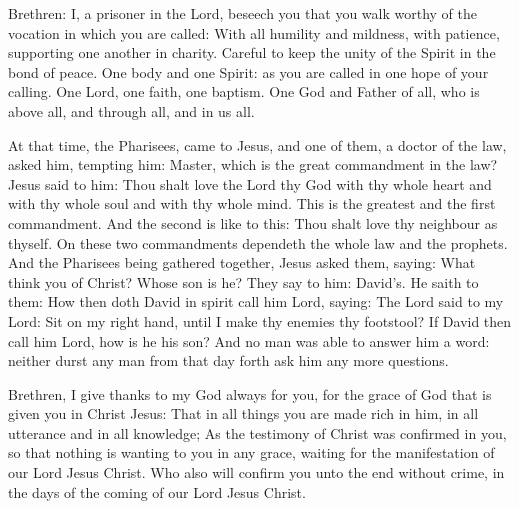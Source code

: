

Brethren: I, a prisoner in the Lord, beseech you that you walk
worthy of the vocation in which you are called:
With all humility and mildness, with patience, supporting one
another in charity.
Careful to keep the unity of the Spirit in the bond of peace.
One body and one Spirit: as you are called in one hope of your
calling.
One Lord, one faith, one baptism.
One God and Father of all, who is above all, and through all, and
in us all.



At that time, the Pharisees, %
came to Jesus, %
and one of them, a doctor of the law, asked him, tempting him:
Master, which is the great commandment in the law?
Jesus said to him: Thou shalt love the Lord thy God with thy
whole heart and with thy whole soul and with thy whole mind.
This is the greatest and the first commandment.
And the second is like to this: Thou shalt love thy neighbour as
thyself.
On these two commandments dependeth the whole law and the
prophets.
And the Pharisees being gathered together, Jesus asked them,
saying: What think you of Christ? Whose son is he? They say to
him: David's.
He saith to them: How then doth David in spirit call him Lord,
saying:
The Lord said to my Lord: Sit on my right hand, until I make thy
enemies thy footstool?
If David then call him Lord, how is he his son?
And no man was able to answer him a word: neither durst any man
from that day forth ask him any more questions.






Brethren, I give thanks to my God always for you, for the grace of God that
is given you in Christ Jesus:
That in all things you are made rich in him, in all utterance and
in all knowledge;
As the testimony of Christ was confirmed in you,
so that nothing is wanting to you in any grace, waiting for the
manifestation of our Lord Jesus Christ.
Who also will confirm you unto the end without crime, in the days
of the coming of our Lord Jesus Christ.




